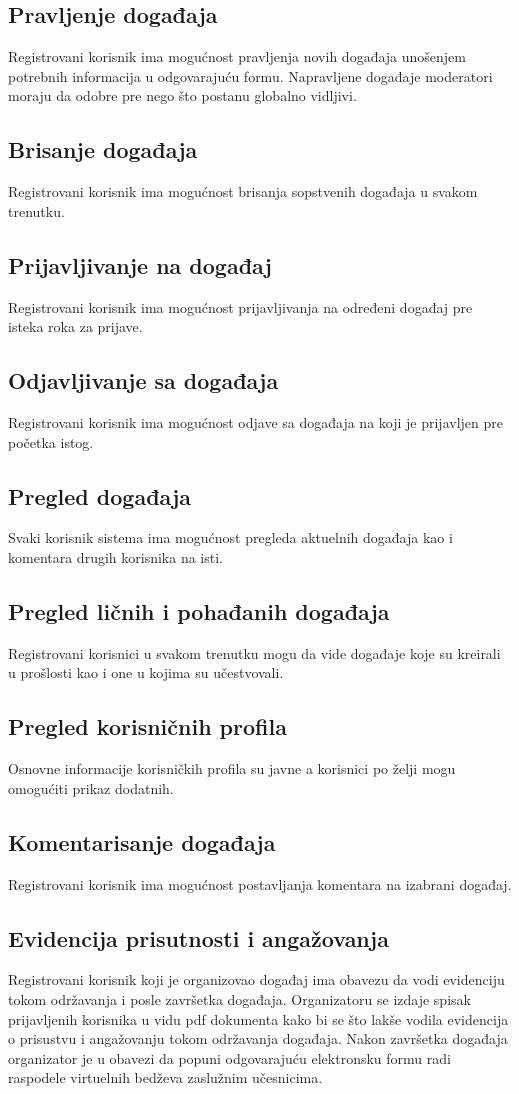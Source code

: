 \documentclass[11pt,a4paper]{article}
\begin{document}
\subsection{Pravljenje događaja}
Registrovani korisnik ima mogućnost pravljenja novih događaja unošenjem potrebnih informacija u odgovarajuću formu. Napravljene događaje moderatori moraju da odobre pre nego što postanu globalno vidljivi.
\subsection{Brisanje događaja}
Registrovani korisnik ima mogućnost brisanja sopstvenih događaja u svakom trenutku.
\subsection{Prijavljivanje na događaj}
Registrovani korisnik ima mogućnost prijavljivanja na određeni događaj pre isteka roka za prijave.
\subsection{Odjavljivanje sa događaja}
Registrovani korisnik ima mogućnost odjave sa događaja na koji je prijavljen pre početka istog.
\subsection{Pregled događaja}
Svaki korisnik sistema ima mogućnost pregleda aktuelnih događaja kao i komentara drugih korisnika na isti.
\subsection{Pregled ličnih i pohađanih događaja}
Registrovani korisnici u svakom trenutku mogu da vide događaje koje su kreirali u prošlosti kao i one u kojima su učestvovali.
\subsection{Pregled korisničnih profila}
Osnovne informacije korisničkih profila su javne a korisnici po želji mogu omogućiti prikaz dodatnih.
\subsection{Komentarisanje događaja}
Registrovani korisnik ima mogućnost postavljanja komentara na izabrani događaj.
\subsection{Evidencija prisutnosti i angažovanja}
Registrovani korisnik koji je organizovao događaj ima obavezu da vodi evidenciju tokom održavanja i posle završetka događaja. Organizatoru se izdaje spisak prijavljenih korisnika u vidu pdf dokumenta kako bi se što lakše vodila evidencija o prisustvu i angažovanju tokom održavanja događaja. Nakon završetka događaja organizator je u obavezi da popuni odgovarajuću elektronsku formu radi raspodele virtuelnih bedževa zaslužnim učesnicima.
\end{document}
